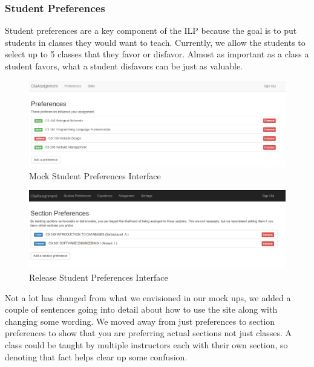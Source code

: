 \subsubsection{Student Preferences}

Student preferences are a key component of the ILP because the goal is to put students in classes they would want to teach.
Currently, we allow the students to select up to 5 classes that they favor or disfavor.
Almost as important as a class a student favors, what a student disfavors can be just as valuable.

\begin{figure}[!htb]
  \centering
  \includegraphics[width=0.75\linewidth]{images/student-preferences-alpha.png}
  \caption{Mock Student Preferences Interface}
\end{figure}
\begin{figure}[!htb]
  \centering
  \includegraphics[width=0.75\linewidth]{images/student-preferences-beta.png}
  \caption{Release Student Preferences Interface}
\end{figure}


Not a lot has changed from what we envisioned in our mock ups, we added a couple of sentences going into detail about how to use the site along with changing some wording.
We moved away from just preferences to section preferences to show that you are preferring actual sections not just classes.
A class could be taught by multiple instructors each with their own section, so denoting that fact helps clear up some confusion.

